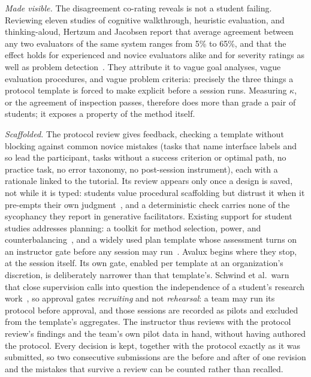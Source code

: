\documentclass[conference]{IEEEtran}
\begin{document}
\emph{Made visible.} The disagreement co-rating reveals is not a student
failing. Reviewing eleven studies of cognitive walkthrough, heuristic
evaluation, and thinking-aloud, Hertzum and Jacobsen report that average
agreement between any two evaluators of the same system ranges from 5\% to
65\%, and that the effect holds for experienced and novice evaluators alike
and for severity ratings as well as problem
detection~\cite{hertzum2001evaluator}. They attribute it to vague goal
analyses, vague evaluation procedures, and vague problem criteria:
precisely the three things a protocol template is forced to make explicit
before a session runs. Measuring $\kappa$, or the agreement of inspection
passes, therefore does more than grade a pair of students; it exposes a
property of the method itself.

\emph{Scaffolded.} The protocol review gives feedback, checking a template
without blocking against common novice mistakes (tasks that name interface
labels and so lead the participant, tasks without a success criterion or
optimal path, no practice task, no error taxonomy, no post-session
instrument), each with a rationale linked to the tutorial. Its review
appears only once a design is saved, not while it is typed: students value
procedural scaffolding but distrust it when it pre-empts their own
judgment~\cite{aziz2026genai}, and a deterministic check carries none of
the sycophancy they report in generative facilitators. Existing support for
student studies addresses planning: a toolkit for method selection, power,
and counterbalancing~\cite{schwind2023toolkit}, and a widely used plan
template whose assessment turns on an instructor gate before any session
may run~\cite{rose2016plan}. Avalux begins where they stop, at the session
itself. Its own gate, enabled per template at an organization's discretion,
is deliberately narrower than that template's. Schwind et al.\ warn that
close supervision calls into question the independence of a student's
research work~\cite{schwind2023toolkit}, so approval gates
\emph{recruiting} and not \emph{rehearsal}: a team may run its protocol
before approval, and those sessions are recorded as pilots and excluded
from the template's aggregates. The instructor thus reviews with the
protocol review's findings and the team's own pilot data in hand, without
having authored the protocol. Every decision is kept, together with the
protocol exactly as it was submitted, so two consecutive submissions are
the before and after of one revision and the mistakes that survive a
review can be counted rather than recalled.
\end{document}
